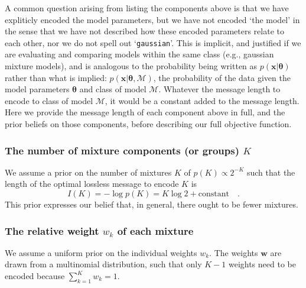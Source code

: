 \documentclass{elsarticle}
\newcommand{\vect}[1]{\boldsymbol{\mathbf{#1}}}
\renewcommand{\vec}[1]{\vect{#1}}
\def\weight{w}
\def\weights{\vect{\weight}}
\newcommand{\prior}[1]{p\left(#1\right)}
\begin{document}

A common question arising from listing the components above is that we have
expliticly encoded the model parameters, but we have not encoded `the model'
in the sense that we have not described how these encoded parameters relate 
to each other, nor we do not spell out `\texttt{gaussian}'. This is implicit,
and justified if we are evaluating and comparing models within the same 
class (e.g., gaussian mixture models), and is analogous to the probability
being written as $p(\vec{x}|\vec{\theta})$ rather than what is implied:
$p(\vec{x}|\vec{\theta},\vec{\mathcal{M}})$, the probability of the data given 
the model parameters $\vec{\theta}$ and class of model $\vec{\mathcal{M}}$.
Whatever the message length to encode to class of model $\vec{\mathcal{M}}$,
it would be a constant added to the message length. Here we provide the 
message length of each component above in full, and the prior beliefs on those 
components, before describing our full objective function.

\subsubsection{The number of mixture components (or groups) $K$}

We assume a prior on the number of mixtures $K$ of $\prior{K} \propto 2^{-K}$
\cite[e.g., see p279, sec. 6.8.2, of ][]{Wallace05} such that the length of the 
optimal lossless message to encode $K$ is 
\begin{equation}
    I(K) = -\log{\prior{K}} = K\log{2} + \textrm{constant} \quad .
\end{equation}
This prior expresses our belief that, in general, there ought to be fewer 
mixtures.



\subsubsection{The relative weight $w_k$ of each mixture}

We assume a uniform prior on the individual weights $\weight_{k}$. The weights
$\weights$ are drawn from a multinomial distribution, such that only $K - 1$
weights need to be encoded because $\sum_{k=1}^{K}\weight_k = 1$.
\end{document}
